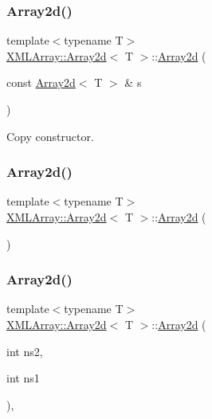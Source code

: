 \subsubsection{\texorpdfstring{Array2d()}{Array2d()}\hspace{0.1cm}{\footnotesize\ttfamily [3/6]}}
{\footnotesize\ttfamily template$<$typename T$>$ \\
\mbox{\hyperlink{classXMLArray_1_1Array2d}{X\+M\+L\+Array\+::\+Array2d}}$<$ T $>$\+::\mbox{\hyperlink{classXMLArray_1_1Array2d}{Array2d}} (\begin{DoxyParamCaption}\item[{const \mbox{\hyperlink{classXMLArray_1_1Array2d}{Array2d}}$<$ T $>$ \&}]{s }\end{DoxyParamCaption})\hspace{0.3cm}{\ttfamily [inline]}}



Copy constructor. 

\mbox{\label{classXMLArray_1_1Array2d_a2f24eccb279e2f1685b58b41f61d9330}} 
\subsubsection{\texorpdfstring{Array2d()}{Array2d()}\hspace{0.1cm}{\footnotesize\ttfamily [4/6]}}
{\footnotesize\ttfamily template$<$typename T$>$ \\
\mbox{\hyperlink{classXMLArray_1_1Array2d}{X\+M\+L\+Array\+::\+Array2d}}$<$ T $>$\+::\mbox{\hyperlink{classXMLArray_1_1Array2d}{Array2d}} (\begin{DoxyParamCaption}{ }\end{DoxyParamCaption})\hspace{0.3cm}{\ttfamily [inline]}}

\mbox{\label{classXMLArray_1_1Array2d_acb1e955b2aa805f3192c50cd723df524}} 
\subsubsection{\texorpdfstring{Array2d()}{Array2d()}\hspace{0.1cm}{\footnotesize\ttfamily [5/6]}}
{\footnotesize\ttfamily template$<$typename T$>$ \\
\mbox{\hyperlink{classXMLArray_1_1Array2d}{X\+M\+L\+Array\+::\+Array2d}}$<$ T $>$\+::\mbox{\hyperlink{classXMLArray_1_1Array2d}{Array2d}} (\begin{DoxyParamCaption}\item[{int}]{ns2,  }\item[{int}]{ns1 }\end{DoxyParamCaption})\hspace{0.3cm}{\ttfamily [inline]}, {\ttfamily [explicit]}}

